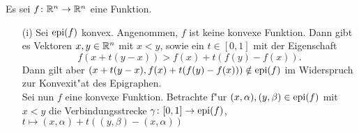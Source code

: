 
Es sei $f\colon\mathbb{R}^n\to\mathbb{R}^n$ eine Funktion.

\begin{itemize}
\item[(i)]
Sei $\operatorname{epi}(f)$ konvex. Angenommen, $f$ ist keine konvexe Funktion. Dann
gibt es Vektoren $x, y\in\mathbb{R}^n$ mit $x<y$, sowie ein $t \in [0,1]$ mit der Eigenschaft
\[
f(x+t (y-x)) > f(x) + t(f(y)-f(x)).
\]
Dann gilt aber $(x+t(y-x), f(x)+t(f(y)-f(x))) \notin \operatorname{epi}(f)$
im Widerspruch zur Konvexit"at des Epigraphen.\\

Sei nun $f$ eine konvexe Funktion. Betrachte f"ur $(x,\alpha), (y,\beta) \in\operatorname{epi}(f)$
mit $x<y$ die Verbindungsstrecke $\gamma\colon[0,1] \to \operatorname{epi}(f)$,
$t\mapsto (x,\alpha) + t((y,\beta)-(x,\alpha))$
\end{itemize}
